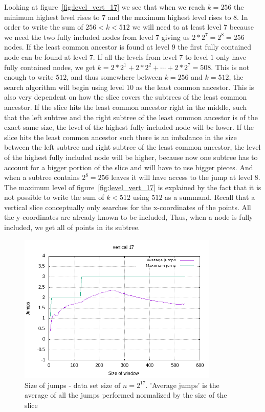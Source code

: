 Looking at figure~\ref{fig:level_vert_17} we see that when we reach $k=256$ the minimum highest level rises to $7$ and the maximum highest level rises to $8$. In order to write the sum of $256<k<512$ we will need to at least level $7$ because we need the two fully included nodes from level $7$ giving us $2*2^7 = 2^8 = 256$ nodes. If the least common ancestor is found at level $9$ the first fully contained node can be found at level $7$. If all the levels from level $7$ to level $1$ only have fully contained nodes, we get $k = 2*2^1 + 2*2^2 + \cdots + 2*2^7 = 508$. This is not enough to write $512$, and thus somewhere between $k=256$ and $k=512$, the search algorithm will begin using level $10$ as the least common ancestor. This is also very dependent on how the slice covers the subtrees of the least common ancestor. If the slice hits the least common ancestor right in the middle, such that the left subtree and the right subtree of the least common ancestor is of the exact same size, the level of the highest fully included node will be lower. If the slice hits the least common ancestor such there is an imbalance in the size between the left subtree and right subtree of the least common ancestor, the level of the highest fully included node will be higher, because now one subtree has to account for a bigger portion of the slice and will have to use bigger pieces. And when a subtree contains $2^8 = 256$ leaves it will have access to the jump at level $8$. The maximum level of figure~\ref{fig:level_vert_17} is explained by the fact that it is not possible to write the sum of $k<512$ using $512$ as a summand. Recall that a vertical slice conceptually only searches for the x-coordinates of the points. All the y-coordinates are already known to be included, Thus, when a node is fully included, we get all of points in its subtree.   


\begin{figure}[h]
    \centering
    \includegraphics[width = 0.85\textwidth]{pictures/analysis/jump_vert_17.png}
    \caption{Size of jumps - data set size of $n=2^{17}$. 'Average jumps' is the average of all the jumps performed normalized by the size of the slice}\label{fig:jump_vert_17}
\end{figure}

